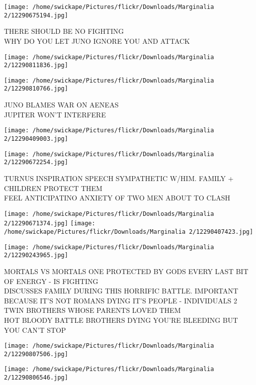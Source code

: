 \documentclass[10pt,letterpaper]{article}
\begin{document}
\vspace{0.25in}
\texttt{[image: /home/swickape/Pictures/flickr/Downloads/Marginalia 2/12290675194.jpg]}

THERE SHOULD BE NO FIGHTING\\
WHY DO YOU LET JUNO IGNORE YOU AND ATTACK\\
\pagebreak

\texttt{[image: /home/swickape/Pictures/flickr/Downloads/Marginalia 2/12290811836.jpg]}

\vspace{0.25in}
\texttt{[image: /home/swickape/Pictures/flickr/Downloads/Marginalia 2/12290810766.jpg]}

JUNO BLAMES WAR ON AENEAS\\
JUPITER WON'T INTERFERE\\
\pagebreak

\texttt{[image: /home/swickape/Pictures/flickr/Downloads/Marginalia 2/12290409003.jpg]}

\vspace{0.25in}
\texttt{[image: /home/swickape/Pictures/flickr/Downloads/Marginalia 2/12290672254.jpg]}

TURNUS INSPIRATION SPEECH SYMPATHETIC W/HIM. FAMILY + CHILDREN PROTECT THEM\\
FEEL ANTICIPATINO ANXIETY OF TWO MEN ABOUT TO CLASH\\
\pagebreak

\texttt{[image: /home/swickape/Pictures/flickr/Downloads/Marginalia 2/12290671374.jpg]}
\texttt{[image: /home/swickape/Pictures/flickr/Downloads/Marginalia 2/12290407423.jpg]}

\texttt{[image: /home/swickape/Pictures/flickr/Downloads/Marginalia 2/12290243965.jpg]}

MORTALS VS MORTALS ONE PROTECTED BY GODS EVERY LAST BIT OF ENERGY {-} IS FIGHTING\\
DISCUSSES FAMILY DURING THIS HORRIFIC BATTLE.  IMPORTANT BECAUSE IT'S NOT ROMANS DYING IT'S PEOPLE {-} INDIVIDUALS 2 TWIN BROTHERS WHOSE PARENTS LOVED THEM\\
HOT BLOODY BATTLE BROTHERS DYING YOU'RE BLEEDING BUT YOU CAN'T STOP\\
\pagebreak

\texttt{[image: /home/swickape/Pictures/flickr/Downloads/Marginalia 2/12290807506.jpg]}

\vspace{0.25in}
\texttt{[image: /home/swickape/Pictures/flickr/Downloads/Marginalia 2/12290806546.jpg]}
\end{document}

